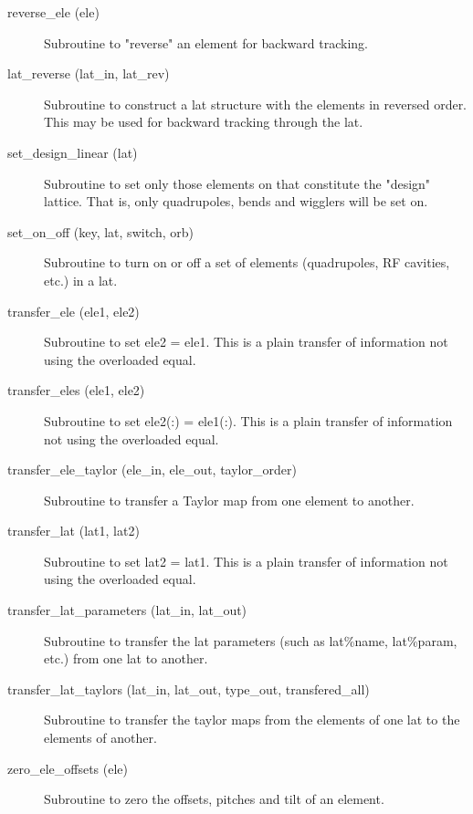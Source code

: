 \begin{description}
\label{r:reverse.ele}
\item[reverse_ele (ele)] \Newline
Subroutine to "reverse" an element for backward tracking. 

\label{r:lat.reverse}
\item[lat_reverse (lat_in, lat_rev)] \Newline
Subroutine to construct a lat structure with the elements in reversed 
order. This may be used for backward tracking through the lat. 

\label{r:set.design.linear}
\item[set_design_linear (lat)] \Newline
Subroutine to set only those elements on that constitute the "design" 
lattice. That is, only quadrupoles, bends and wigglers will be set on. 

\label{r:set.on.off}
\item[set_on_off (key, lat, switch, orb)] \Newline
Subroutine to turn on or off a set of elements (quadrupoles,
RF cavities, etc.) in a lat.

\label{r:transfer.ele}
\item[transfer_ele (ele1, ele2)] \Newline 
     Subroutine to set ele2 = ele1. 
     This is a plain transfer of information not using the overloaded equal.

\label{r:transfer.eles}
\item[transfer_eles (ele1, ele2)] \Newline 
     Subroutine to set ele2(:) = ele1(:). 
     This is a plain transfer of information not using the overloaded equal.

\item[transfer_ele_taylor (ele_in, ele_out, taylor_order)] \Newline 
     Subroutine to transfer a Taylor map from one element to another.

\label{r:transfer.lat}
\item[transfer_lat (lat1, lat2)] \Newline 
     Subroutine to set lat2 = lat1. 
     This is a plain transfer of information not using the overloaded equal.

\label{r:transfer.lat.parameters}
\item[transfer_lat_parameters (lat_in, lat_out)] \Newline
Subroutine to transfer the lat parameters (such as lat\%name, 
lat\%param, etc.) from one lat to another. 

\item[transfer_lat_taylors (lat_in, lat_out, 
                        type_out, transfered_all)] \Newline 
Subroutine to transfer the taylor maps from the elements of one lat to
the elements of another. 

\label{r:zero.ele.offsets}
\item[zero_ele_offsets (ele)] \Newline 
Subroutine to zero the offsets, pitches and tilt of an element.

\end{description}

